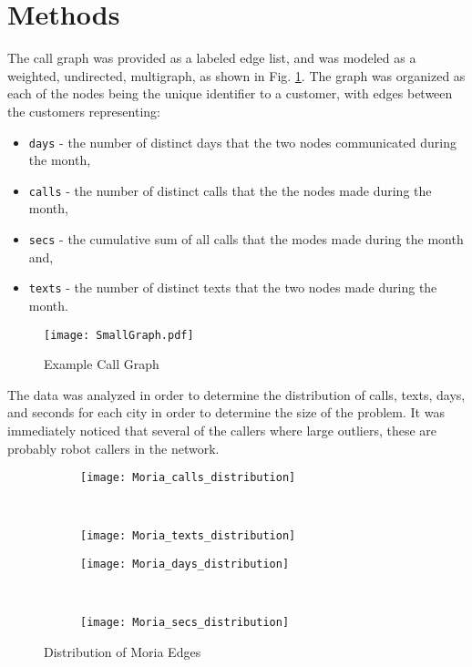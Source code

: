 \section{Methods}
\label{sec:Methods}

The call graph was provided as a labeled edge list, and was modeled as a weighted, undirected, multigraph, as shown in Fig. \ref{fig:SmallGraph}.
The graph was organized as each of the nodes being the unique identifier to a customer, with edges between the customers representing:
\begin{itemize}
	\item \texttt{days} - the number of distinct days that the two nodes communicated during the month,
	\item \texttt{calls} - the number of distinct calls that the the nodes made during the month,
	\item \texttt{secs} - the cumulative sum of all calls that the modes made during the month and,
	\item \texttt{texts} - the number of distinct texts that the two nodes made during the month.
\end{itemize}
\begin{figure}[ht]
\centering
\texttt{[image: SmallGraph.pdf]}
\caption{Example Call Graph}
\label{fig:SmallGraph}
\end{figure} 
The data was analyzed in order to determine the distribution of calls, texts, days, and seconds for each city in order to determine the size of the problem.
It was immediately noticed that several of the callers where large outliers, these are probably robot callers in the network.
\begin{figure*}[ht!]
	\centering
	\begin{subfigure}[b]{0.45\textwidth}
		\centering
		\texttt{[image: Moria\_calls\_distribution]}
	\end{subfigure}%
	~
	\begin{subfigure}[b]{0.45\textwidth}
		\centering
		\texttt{[image: Moria\_texts\_distribution]}
	\end{subfigure}
	

	\begin{subfigure}[b]{0.45\textwidth}
		\centering
		\texttt{[image: Moria\_days\_distribution]}
	\end{subfigure}%
	~
	\begin{subfigure}[b]{0.45\textwidth}
		\centering
		\texttt{[image: Moria\_secs\_distribution]}
	\end{subfigure}
	\caption{Distribution of Moria Edges}
	\label{fig:MoriaEdgeDist}
\end{figure*}
